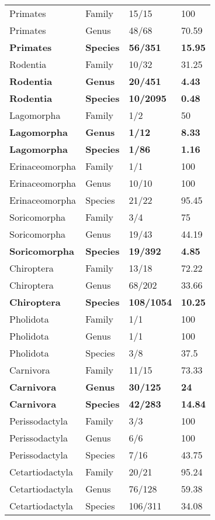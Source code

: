 \begin{longtable}{llll}
  Primates & Family & 15/15 & 100 \\ 
  Primates & Genus & 48/68 & 70.59 \\ 
  \textbf{Primates} & \textbf{Species} & \textbf{56/351} & \textbf{15.95} \\ 
  Rodentia & Family & 10/32 & 31.25 \\ 
  \textbf{Rodentia} & \textbf{Genus} & \textbf{20/451} & \textbf{4.43} \\ 
  \textbf{Rodentia} & \textbf{Species} & \textbf{10/2095} & \textbf{0.48} \\ 
  Lagomorpha & Family & 1/2 & 50 \\ 
  \textbf{Lagomorpha} & \textbf{Genus} & \textbf{1/12} & \textbf{8.33} \\ 
  \textbf{Lagomorpha} & \textbf{Species} & \textbf{1/86} & \textbf{1.16} \\ 
  Erinaceomorpha & Family & 1/1 & 100 \\ 
  Erinaceomorpha & Genus & 10/10 & 100 \\ 
  Erinaceomorpha & Species & 21/22 & 95.45 \\ 
  Soricomorpha & Family & 3/4 & 75 \\ 
  Soricomorpha & Genus & 19/43 & 44.19 \\ 
  \textbf{Soricomorpha} & \textbf{Species} & \textbf{19/392} & \textbf{4.85} \\ 
  Chiroptera & Family & 13/18 & 72.22 \\ 
  Chiroptera & Genus & 68/202 & 33.66 \\ 
  \textbf{Chiroptera} & \textbf{Species} & \textbf{108/1054} & \textbf{10.25} \\ 
  Pholidota & Family & 1/1 & 100 \\ 
  Pholidota & Genus & 1/1 & 100 \\ 
  Pholidota & Species & 3/8 & 37.5 \\ 
  Carnivora & Family & 11/15 & 73.33 \\ 
  \textbf{Carnivora} & \textbf{Genus} & \textbf{30/125} & \textbf{24} \\ 
  \textbf{Carnivora} & \textbf{Species} & \textbf{42/283} & \textbf{14.84} \\ 
  Perissodactyla & Family & 3/3 & 100 \\ 
  Perissodactyla & Genus & 6/6 & 100 \\ 
  Perissodactyla & Species & 7/16 & 43.75 \\ 
  Cetartiodactyla & Family & 20/21 & 95.24 \\ 
  Cetartiodactyla & Genus & 76/128 & 59.38 \\ 
  Cetartiodactyla & Species & 106/311 & 34.08 \\ 
   \hline
\hline
\end{longtable}
